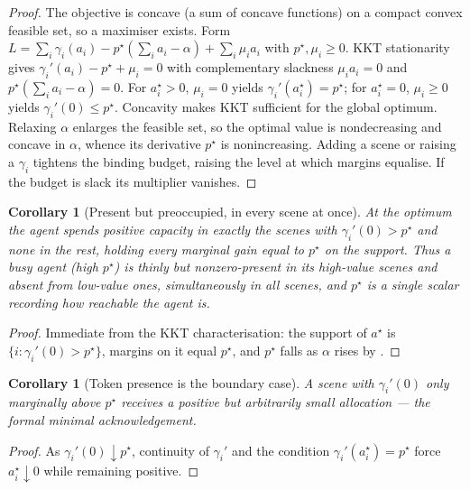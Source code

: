 \documentclass[11pt,a4paper]{article}
\theoremstyle{clstyle}
\newtheorem{corollary}[theorem]{Corollary}
\theoremstyle{definition}
\theoremstyle{remark}
\newcommand{\price}{p^{\star}}
\newcommand{\att}{\alpha}
\begin{document}
\begin{proof}
The objective is concave (a sum of concave functions) on a compact convex
feasible set, so a maximiser exists. Form
$L=\sum_i\gamma_i(a_i)-\price(\sum_i a_i-\att)+\sum_i\mu_i a_i$ with
$\price,\mu_i\ge0$. KKT stationarity \citep{kuhntucker1951nonlinear,
boyd2004convex} gives $\gamma_i'(a_i)-\price+\mu_i=0$ with complementary
slackness $\mu_i a_i=0$ and $\price(\sum_i a_i-\att)=0$. For
$a_i^{\star}>0$, $\mu_i=0$ yields $\gamma_i'(a_i^{\star})=\price$; for
$a_i^{\star}=0$, $\mu_i\ge0$ yields $\gamma_i'(0)\le\price$. Concavity makes
KKT sufficient for the global optimum. Relaxing $\att$ enlarges the feasible
set, so the optimal value is nondecreasing and concave in $\att$, whence its
derivative $\price$ is nonincreasing. Adding a scene or raising a
$\gamma_i$ tightens the binding budget, raising the level at which margins
equalise. If the budget is slack its multiplier vanishes.
\end{proof}

\begin{corollary}[Present but preoccupied, in every scene at once]
\label{cor:preoccupied}
At the optimum the agent spends positive capacity in exactly the scenes with
$\gamma_i'(0)>\price$ and none in the rest, holding every marginal gain equal
to $\price$ on the support. Thus a busy agent (high $\price$) is thinly but
nonzero-present in its high-value scenes and absent from low-value ones,
\emph{simultaneously in all scenes}, and $\price$ is a single scalar
recording how reachable the agent is.
\end{corollary}

\begin{proof}
Immediate from the KKT characterisation: the support of $a^{\star}$ is
$\{i:\gamma_i'(0)>\price\}$, margins on it equal $\price$, and $\price$
falls as $\att$ rises by .
\end{proof}

\begin{corollary}[Token presence is the boundary case]
\label{cor:token}
A scene with $\gamma_i'(0)$ only marginally above $\price$ receives a
positive but arbitrarily small allocation --- the formal minimal
acknowledgement.
\end{corollary}

\begin{proof}
As $\gamma_i'(0)\downarrow\price$, continuity of $\gamma_i'$ and the
condition $\gamma_i'(a_i^{\star})=\price$ force $a_i^{\star}\downarrow0$
while remaining positive.
\end{proof}
\end{document}
